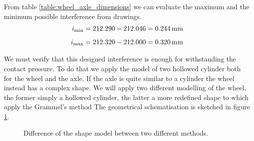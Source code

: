 \documentclass[a4paper,12pt]{article}
\begin{document}
From table \ref{table:wheel_axle_dimensions} we can evaluate the maximum and the minimum possible interference from drawings.
\begin{align}
i_\text{min} &= 212.290 - 212.046 = 0.244 \,\text{mm} \\[0.5em]
i_\text{max} &= 212.320 - 212.000 = 0.320 \,\text{mm}
\end{align}

We must verify that this designed interference is enough for withstanding the contact pressure.
To do that we apply the model of two hollowed cylinder both for the wheel and the axle. If the axle is quite similar to a cylinder the wheel instead has a complex shape.
We will apply two different modelling of the wheel, the former simply a hollowed cylinder, the latter a more redefined shape to which apply the Grammel's method 
The geometrical schematisation is sketched in figure \ref{fig:wheel_geometry}.

\begin{figure}[H]
\centering     %
\caption{Difference of the shape model between two different methods.}
\qquad
\qquad
\qquad
{}
\label{fig:wheel_geometry}
\end{figure}
\end{document}
